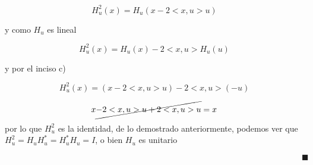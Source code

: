 \documentclass[12pt,a4paper]{article}
\begin{document}
\begin{enumerate}
\begin{enumerate}
        \begin{equation*}
            H_u^2(x)=H_u(x-2<x,u>u)
        \end{equation*}
        
        y como $H_u$ es lineal
        
        \begin{equation*}
            H_u^2(x)=H_u(x)-2<x,u>H_u(u)
        \end{equation*}
        
        y por el inciso c)
        
        \begin{equation*}
            H_u^2(x)=(x-2<x,u>u)-2<x,u>(-u)
        \end{equation*}
        
        \begin{equation*}
            x\cancel{-2<x,u>u+2<x,u>u}=x
        \end{equation*}
        
        por lo que $H_u^2$ es la identidad, de lo demostrado anteriormente, podemos ver que $H_u^2=H_uH_u^*=H_u^*H_u=I$, o bien $H_u$ es unitario
        
        $\hspace{15cm} \blacksquare$
        
        
        
        
        
        
    \end{enumerate}
\end{enumerate}
\end{document}
